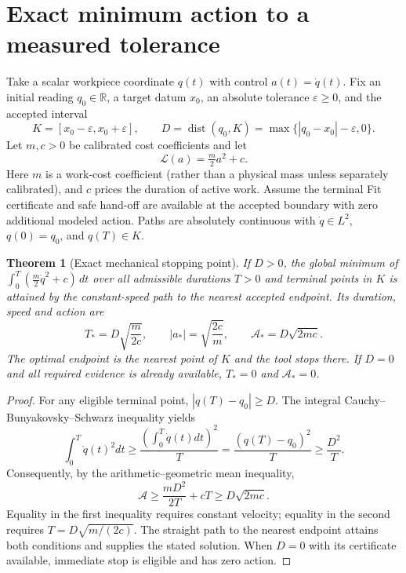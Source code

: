 \documentclass[11pt,letterpaper]{article}
\newtheorem{theorem}{Theorem}
\theoremstyle{definition}\newtheorem{definition}{Definition}
\newcommand{\Act}{\mathcal A}
\newcommand{\Lag}{\mathscr L}
\newcommand{\dist}{\operatorname{dist}}
\begin{document}
\section{Exact minimum action to a measured tolerance}
Take a scalar workpiece coordinate $q(t)$ with control $a(t)=\dot q(t)$. Fix an initial reading $q_0\in\mathbb R$, a target datum $x_0$, an absolute tolerance $\varepsilon\ge0$, and the accepted interval
\begin{equation}\label{eq:K}
K=[x_0-\varepsilon,x_0+\varepsilon],\qquad
D=\dist(q_0,K)=\max\{|q_0-x_0|-\varepsilon,0\}.
\end{equation}
Let $m,c>0$ be calibrated cost coefficients and let
\begin{equation}\label{eq:modelL}
\Lag(a)=\tfrac m2a^2+c.
\end{equation}
Here $m$ is a work-cost coefficient (rather than a physical mass unless separately calibrated), and $c$ prices the duration of active work. Assume the terminal Fit certificate and safe hand-off are available at the accepted boundary with zero additional modeled action. Paths are absolutely continuous with $\dot q\in L^2$, $q(0)=q_0$, and $q(T)\in K$.

\begin{theorem}[Exact mechanical stopping point]\label{thm:caliper}
If $D>0$, the global minimum of $\int_0^T(\tfrac m2\dot q^2+c)\,dt$ over all admissible durations $T>0$ and terminal points in $K$ is attained by the constant-speed path to the nearest accepted endpoint. Its duration, speed and action are
\begin{equation}\label{eq:scalarresult}
\boxed{T_*=D\sqrt{\frac{m}{2c}},\qquad
|a_*|=\sqrt{\frac{2c}{m}},\qquad
\Act_*=D\sqrt{2mc}.}
\end{equation}
The optimal endpoint is the nearest point of $K$ and the tool stops there. If $D=0$ and all required evidence is already available, $T_*=0$ and $\Act_*=0$.
\end{theorem}
\begin{proof}
For any eligible terminal point, $|q(T)-q_0|\ge D$. The integral Cauchy--Bunyakovsky--Schwarz inequality \cite{cauchy,bunyakovsky} yields
\[
\int_0^T\dot q(t)^2dt\ge\frac{(\int_0^T\dot q(t)dt)^2}{T}
=\frac{(q(T)-q_0)^2}{T}\ge\frac{D^2}{T}.
\]
Consequently, by the arithmetic--geometric mean inequality,
\begin{equation}\label{eq:AMGM}
\Act\ge\frac{mD^2}{2T}+cT\ge D\sqrt{2mc}.
\end{equation}
Equality in the first inequality requires constant velocity; equality in the second requires $T=D\sqrt{m/(2c)}$. The straight path to the nearest endpoint attains both conditions and supplies the stated solution. When $D=0$ with its certificate available, immediate stop is eligible and has zero action.
\end{proof}
\end{document}
